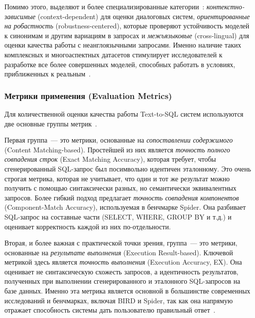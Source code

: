 Помимо этого, выделяют и более специализированные
категории~\cite{huangExploringLandscapeTexttoSQL2025}:
\textit{контекстно-зависимые} (context-dependent) для оценки диалоговых систем,
\textit{ориентированные на робастность} (robustness-centered), которые проверяют
устойчивость моделей к синонимам и другим вариациям в
запросах и \textit{межъязыковые} (cross-lingual) для оценки качества работы с
неанглоязычными запросами. Именно наличие таких комплексных и
многоаспектных датасетов стимулирует исследователей к разработке все более совершенных моделей,
способных работать в условиях, приближенных к реальным~\cite{mohammadjafariNaturalLanguageSQL2025,
	gaoPreviewXiYanSQLMultiGenerator2025}.

\subsubsection{Метрики применения (Evaluation Metrics)}

Для количественной оценки
качества работы Text-to-SQL систем используются две основные группы
метрик~\cite{huangExploringLandscapeTexttoSQL2025}.

Первая группа~--- это метрики,
основанные на \textit{сопоставлении содержимого} (Content Matching-based).
Простейшей из них является \textit{точность полного совпадения строк} (Exact Matching Accuracy),
которая требует, чтобы сгенерированный SQL-запрос был посимвольно идентичен эталонному.
Это очень строгая метрика, которая не учитывает, что один и тот же результат можно
получить с помощью синтаксически разных, но семантически эквивалентных запросов.
Более гибкий подход предлагает \textit{точность совпадения компонентов} (Component-Match Accuracy),
используемая в бенчмарке Spider. Она разбивает SQL-запрос на
составные части (SELECT, WHERE, GROUP BY и т.д.) и оценивает корректность
каждой из них по-отдельности.

Вторая, и более важная с практической точки зрения, группа~--- это метрики,
основанные на \textit{результате выполнения} (Execution Result-based).
Ключевой метрикой здесь является \textit{точность выполнения} (Execution Accuracy, EX).
Она оценивает не синтаксическую схожесть запросов, а идентичность результатов,
полученных при выполнении сгенерированного и эталонного SQL-запросов на базе данных.
Именно эта метрика является основной в большинстве современных исследований и бенчмарках,
включая BIRD и Spider, так как она напрямую отражает способность системы дать
пользователю правильный ответ~\cite{huangExploringLandscapeTexttoSQL2025,
	gaoPreviewXiYanSQLMultiGenerator2025}.


